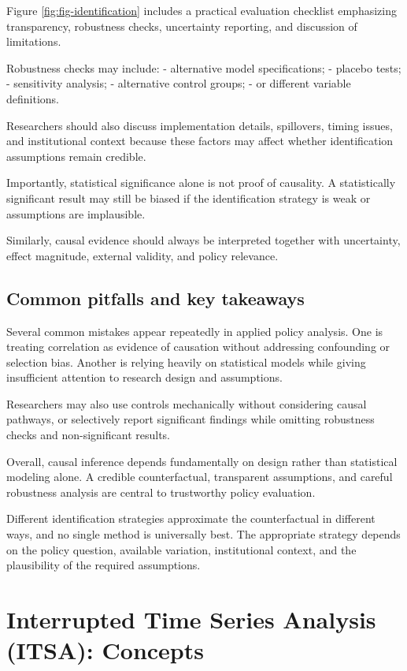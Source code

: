 \documentclass[
  11pt,
  oneside]{book}
\begin{document}
Figure \ref{fig:fig-identification} includes a practical evaluation checklist emphasizing transparency, robustness checks, uncertainty reporting, and discussion of limitations.

Robustness checks may include:
- alternative model specifications;
- placebo tests;
- sensitivity analysis;
- alternative control groups;
- or different variable definitions.

Researchers should also discuss implementation details, spillovers, timing issues, and institutional context because these factors may affect whether identification assumptions remain credible.

Importantly, statistical significance alone is not proof of causality. A statistically significant result may still be biased if the identification strategy is weak or assumptions are implausible.

Similarly, causal evidence should always be interpreted together with uncertainty, effect magnitude, external validity, and policy relevance.

\section{Common pitfalls and key takeaways}\label{common-pitfalls-and-key-takeaways-4}

Several common mistakes appear repeatedly in applied policy analysis. One is treating correlation as evidence of causation without addressing confounding or selection bias. Another is relying heavily on statistical models while giving insufficient attention to research design and assumptions.

Researchers may also use controls mechanically without considering causal pathways, or selectively report significant findings while omitting robustness checks and non-significant results.

Overall, causal inference depends fundamentally on design rather than statistical modeling alone. A credible counterfactual, transparent assumptions, and careful robustness analysis are central to trustworthy policy evaluation.

Different identification strategies approximate the counterfactual in different ways, and no single method is universally best. The appropriate strategy depends on the policy question, available variation, institutional context, and the plausibility of the required assumptions.

\chapter{Interrupted Time Series Analysis (ITSA): Concepts}\label{itsa}
\end{document}
